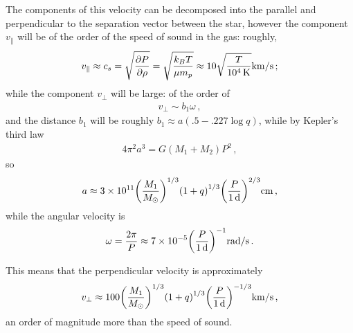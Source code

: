 \documentclass[main.tex]{subfiles}
\begin{document}
The components of this velocity can be decomposed into the parallel and perpendicular to the separation vector between the star, however the component \(v _ \parallel\) will be of the order of the speed of sound in the gas: roughly, 
%
\begin{align}
v_{\parallel} \approx c_s = \sqrt{ \pdv{P}{\rho }} = \sqrt{\frac{k_B T}{\mu m_p}} \approx \num{10} \sqrt{ \frac{T}{\SI{e4}{K}}} \SI{}{km /s}
\,;
\end{align}
%
while the component \(v_\perp\) will be large: of the order of 
%
\begin{align}
v_\perp \sim b_1 \omega 
\,,
\end{align}
%
and the distance \(b_1\) will be roughly \(b_1 \approx a (\num{.5} - \num{.227} \log q)\), while by Kepler's third law 
%
\begin{align}
4 \pi^2 a^3 = G (M_1 + M_2 ) P^2
\,,
\end{align}
%
so 
%
\begin{align}
a \approx \num{3e11} \qty(\frac{M_1 }{M_{\odot}})^{1/3}
\qty(1 + q)^{1/3}
\qty(\frac{P}{\SI{1}{d}})^{2/3} 
\SI{}{cm}
\,,
\end{align}
%
while the angular velocity is 
%
\begin{align}
\omega = \frac{2 \pi }{P} \approx \num{7e-5} \qty(\frac{P}{\SI{1}{d}})^{-1} \SI{}{rad/s}
\,.
\end{align}

This means that the perpendicular velocity is approximately 
%
\begin{align}
v_{\perp} \approx \num{100} \qty(\frac{M_1 }{M_{\odot}})^{1/3}
\qty(1 + q)^{1/3}
\qty(\frac{P}{\SI{1}{d}})^{-1/3}
\SI{}{km/s}
\,,
\end{align}
%
an order of magnitude more than the speed of sound. 
\end{document}
